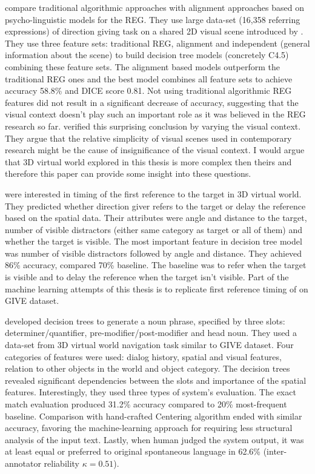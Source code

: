 \citet{viethen2011generating} compare traditional algorithmic approaches with alignment approaches based on psycho-linguistic models for the REG. They use large data-set (16,358 referring expressions) of direction giving task on a shared 2D visual scene introduced by \citet{louwerse2007multimodal}. They use three feature sets: traditional REG, alignment and independent (general information about the scene) to build decision tree models (concretely C4.5) combining these feature sets. The alignment based models outperform the traditional REG ones and the best model combines all feature sets to achieve accuracy 58.8\% and DICE score 0.81. Not using traditional algorithmic REG features did not result in a significant decrease of accuracy, suggesting that the visual context doesn't play such an important role as it was believed in the REG research so far.  \citet{viethen2011impact} verified this surprising conclusion by varying the visual context. They argue that the relative simplicity of visual scenes used in contemporary research might be the cause of insignificance of the visual context. I would argue that 3D  virtual world explored in this thesis is more complex then theirs and therefore this paper can provide some insight into these questions.  

\citet{stoia2006sentence} were interested in timing of the first reference to the target in 3D virtual world. They predicted whether direction giver refers to the target or delay the reference based on the spatial data. Their attributes were angle and distance to the target, number of visible distractors (either same category as target or all of them) and whether the target is visible. The most important feature in decision tree model was number of visible distractors followed by angle and distance. They achieved 86\% accuracy, compared 70\% baseline. The baseline was to refer when the target is visible and to delay the reference when the target isn't visible. Part of the machine learning attempts of this thesis is to replicate first reference timing of \citet{stoia2006sentence} on GIVE dataset.

\citet{stoia2006noun} developed decision trees to generate a noun phrase, specified by three slots: determiner/quantifier, pre-modifier/post-modifier and head noun. They used a data-set from 3D virtual world navigation task similar to GIVE dataset. Four categories of features were used: dialog history, spatial and visual features, relation to other objects in the world and object category. The decision trees revealed significant dependencies between the slots and importance of the spatial features. Interestingly, they used three types of system's evaluation. The exact match evaluation produced 31.2\% accuracy compared to 20\% most-frequent baseline. Comparison with hand-crafted Centering algorithm \citep{kibble2000integrated} ended with similar accuracy, favoring the machine-learning approach for requiring less structural analysis of the input text. Lastly, when human judged the system output, it was at least equal or preferred to original spontaneous language in 62.6\% (inter-annotator reliability $\kappa = 0.51$).

